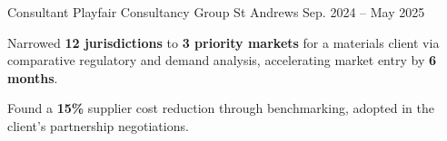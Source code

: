 \begin{cventries}
  \cventry
    {Consultant} %
    {Playfair Consultancy Group} %
    {St Andrews} %
    {Sep. 2024 -- May 2025} %
    {
      \begin{cvitems}
        \item {Narrowed \textbf{12 jurisdictions} to \textbf{3 priority markets} for a materials client via comparative regulatory and demand analysis, accelerating market entry by \textbf{6 months}.}
        \item {Found a \textbf{15\%} supplier cost reduction through benchmarking, adopted in the client's partnership negotiations.}
      \end{cvitems}
    }

\end{cventries}

